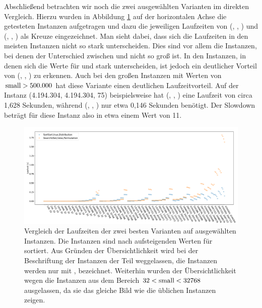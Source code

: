 Abschließend betrachten wir noch die zwei ausgewählten Varianten im direkten Vergleich. Hierzu wurden
in Abbildung \ref{fig:messung_small} auf der horizontalen Achse die getesteten Instanzen aufgetragen
und dazu die jeweiligen Laufzeiten von (\SorSor, \true, \distr) und (\SeaUSet, \false, \perm) als Kreuze
eingezeichnet. 
Man sieht dabei, dass sich die Laufzeiten in den meisten Instanzen nicht so stark unterscheiden.
Dies sind vor allem die Instanzen, bei denen der Unterschied zwischen \la{} und \sm{} nicht so groß ist.
In den Instanzen, in denen sich die Werte für \sm{} und \la{} stark unterscheiden, ist jedoch ein 
deutlicher Vorteil von (\SorSor, \true, \distr) zu erkennen. Auch bei den \glqq großen\grqq{} Instanzen
mit Werten von $\text{small{}}> 500.000$ hat diese Variante einen deutlichen Laufzeitvorteil.
Auf der Instanz (4.194.304, 4.194.304, 75) beispielsweise hat (\SeaUSet, \false, \perm) eine Laufzeit
von circa 1,628 Sekunden, während (\SorSor, \true, \distr) nur etwa 0,146 Sekunden benötigt. Der Slowdown
beträgt für diese Instanz also in etwa einem Wert von 11. 
\begin{figure}
\centering
	\includegraphics[width = \textwidth]{figures/small_aufsteigend.pdf}
	\caption[Laufzeitvergleich der zwei besten Varianten auf ausgewählten Instanzen] {Vergleich der Laufzeiten der zwei besten Varianten auf ausgewählten Instanzen.
			Die Instanzen sind nach aufsteigenden Werten für \sm{} sortiert. Aus Gründen der Übersichtlichkeit
wird bei  der Beschriftung der Instanzen der Teil \fr{} weggelassen, die Instanzen werden 
nur mit \la{}, \sm{} bezeichnet. Weiterhin wurden der
Übersichtlichkeit wegen die Instanzen aus dem Bereich $32 < \text{small}  <32768$ ausgelassen, da sie das gleiche
Bild wie die üblichen Instanzen zeigen.}
	\label{fig:messung_small}
\end{figure}


